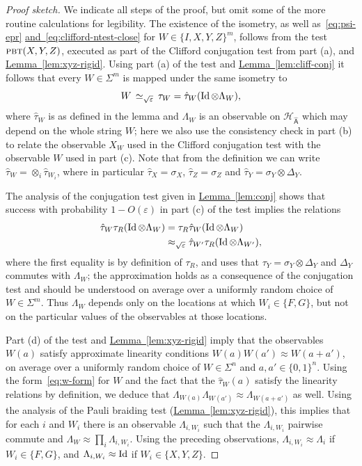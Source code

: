 \documentclass[11pt]{article}
\numberwithin{equation}{section}
\theoremstyle{definition}
\theoremstyle{plain}
\newcommand{\expref}[2]{\hyperref[#2]{#1~\ref{#2}}}
\newcommand{\expeqref}[2]{\hyperref[#2]{#1~\eqref{#2}}}
\newcommand{\Id}{\ensuremath{\mathop{\rm Id}\nolimits}}
\newcommand{\reg}[1]{{\textsf{#1}}}
\newcommand{\mH}{\mathcal{H}}
\newcommand{\eps}{\varepsilon}
\newcommand{\pbt}{\textsc{pbt}}
\newcommand{\phase}{\Lambda}
\begin{document}
\begin{proof}[Proof sketch]
We indicate all steps of the proof, but omit some of the more routine calculations for legibility. 
The existence of the isometry, as well as~\eqref{eq:psi-epr} \expeqref{and}{eq:clifford-ntest-close} for $W \in \{I,X,Y,Z\}^{m}$, follows from the test $\pbt(X,Y,Z)$, executed as part of the Clifford conjugation test from part (a), and \expref{Lemma}{lem:xyz-rigid}. 
Using part (a) of the test and \expref{Lemma}{lem:cliff-conj} it follows that every $W \in \Sigma^m$ is mapped under the same isometry to 
\begin{equation}\label{eq:w-form}
W \,\simeq_{\sqrt{\eps}}\, \tau_W = \hat{\tau}_W(\Id \otimes \phase_W),
\end{equation}
 where $\hat{\tau}_W$ is as defined in the lemma  and  $\phase_W$ is an observable on $\mH_{\hat{\reg{A}}}$ which may depend on the whole string $W$;  here we also use the consistency check in part (b) to relate  the observable $X_W$ used in the Clifford conjugation test with the observable $W$ used in part (c). Note that from the definition we can write $\hat{\tau}_W = \otimes_i \hat{\tau}_{W_i}$, where in particular $\hat{\tau}_X = \sigma_X$, $\hat{\tau}_Z = \sigma_Z$ and $\hat{\tau}_Y = \sigma_Y \otimes \Delta_Y$.

The analysis of the conjugation test given in \expref{Lemma}{lem:conj} shows that success with probability $1-O(\eps)$ in part (c) of the test implies the relations 
\begin{align*}
 \hat{\tau}_W \tau_R(\Id \otimes \phase_W)  &= \tau_R \hat{\tau}_W  (\Id\otimes\phase_W) \\
&  \approx_{\sqrt{\eps}} \hat{\tau}_{W'}  \tau_R (\Id\otimes \phase_{W'}),
\end{align*}
where the first equality is by definition of $\tau_R$, and uses that $\tau_Y = \sigma_Y \otimes \Delta_Y$ and $\Delta_Y$ commutes with $\phase_W$; the approximation holds as a consequence of the conjugation test and should be understood on average over a uniformly random choice of $W\in \Sigma^m$. Thus $\phase_W$ depends only on the locations at which $W_i \in \{F,G\}$, but not on the particular values of the observables at those locations.  

Part (d) of the test and \expref{Lemma}{lem:xyz-rigid} imply that the observables $W(a)$ satisfy approximate linearity conditions $W(a)W(a')\approx W(a+a')$, on average over a uniformly random choice of $W\in\Sigma^n$ and $a,a'\in\{0,1\}^n$. Using the form~\eqref{eq:w-form} for $W$ and the fact that the $\hat{\tau}_W(a)$ satisfy the linearity relations by definition, we deduce that $\phase_{W(a)}\phase_{{W(a')}} \approx \phase_{W(a+a')}$ as well. Using the analysis of the Pauli braiding test (\expref{Lemma}{lem:xyz-rigid}), this implies that for each $i$ and $W_i$ there is an observable $\phase_{i,W_i}$ such that the $\phase_{i,W_i}$ pairwise commute and $\phase_W \approx \prod_i \phase_{i,W_i}$. Using the preceding observations, $\phase_{i,W_i} \approx \phase_i$ if $W_i \in\{F,G\}$, and $\phase_{i,W_i} \approx \Id$ if $W_i \in \{X,Y,Z\}$. 


\end{proof}
\end{document}
